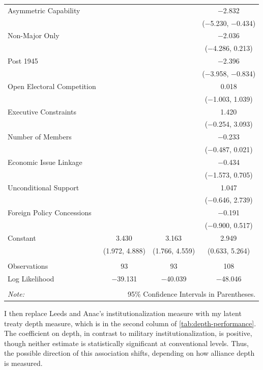\documentclass[12pt]{article}
\begin{document}
\begin{table}[!htbp]
\begin{adjustbox}{width= .95\textwidth, center}
\begin{tabular}{@{\extracolsep{5pt}}lccc}
  Asymmetric Capability &  &  & $-$2.832$^{}$ \\ 
  &  &  & ($-$5.230, $-$0.434) \\ 
  Non-Major Only &  &  & $-$2.036$^{}$ \\ 
  &  &  & ($-$4.286, 0.213) \\ 
  Post 1945 &  &  & $-$2.396$^{}$ \\ 
  &  &  & ($-$3.958, $-$0.834) \\ 
  Open Electoral Competition &  &  & 0.018 \\ 
  &  &  & ($-$1.003, 1.039) \\ 
  Executive Constraints &  &  & 1.420$^{}$ \\ 
  &  &  & ($-$0.254, 3.093) \\ 
  Number of Members &  &  & $-$0.233$^{}$ \\ 
  &  &  & ($-$0.487, 0.021) \\ 
  Economic Issue Linkage &  &  & $-$0.434 \\ 
  &  &  & ($-$1.573, 0.705) \\ 
  Unconditional Support &  &  & 1.047 \\ 
  &  &  & ($-$0.646, 2.739) \\ 
  Foreign Policy Concessions &  &  & $-$0.191 \\ 
  &  &  & ($-$0.900, 0.517) \\ 
  Constant & 3.430$^{}$ & 3.163$^{}$ & 2.949$^{}$ \\ 
  & (1.972, 4.888) & (1.766, 4.559) & (0.633, 5.264) \\ 
 \hline \\[-1.8ex] 
Observations & 93 & 93 & 108 \\ 
Log Likelihood & $-$39.131 & $-$40.039 & $-$48.046 \\ 
\hline 
\hline \\[-1.8ex] 
\textit{Note:}  & \multicolumn{3}{r}{95\% Confidence Intervals in Parentheses.} \\ 
\end{tabular}
\end{adjustbox} 
\end{table}


I then replace Leeds and Anac's institutionalization measure with my latent treaty depth measure, which is in the second column of \autoref{tab:depth-performance}. 
The coefficient on depth, in contrast to military institutionalization, is positive, though neither estimate is statistically significant at conventional levels. 
Thus, the possible direction of this association shifts, depending on how alliance depth is measured.
\end{document}
